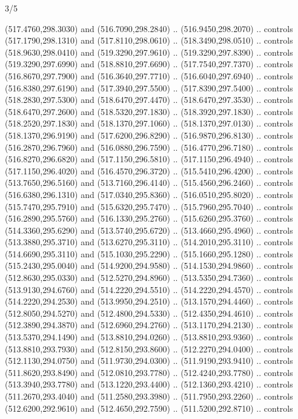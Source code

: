 \begin{flagdescription}{3/5}
\begin{scope}[shift={(0.5\flaglength,0.5\flagwidth)},scale=\flagwidth/1075]
\begin{scope}[y=0.80pt, x=0.80pt, yscale=-2.37, xscale=2.37,xshift=-402,yshift=-230.4]
  (517.4760,298.3030) and (516.7090,298.2840) .. (516.9450,298.2070) .. controls
  (517.1790,298.1310) and (517.8110,298.0610) .. (518.3490,298.0510) .. controls
  (518.9630,298.0410) and (519.3290,297.9610) .. (519.3290,297.8390) .. controls
  (519.3290,297.6990) and (518.8810,297.6690) .. (517.7540,297.7370) .. controls
  (516.8670,297.7900) and (516.3640,297.7710) .. (516.6040,297.6940) .. controls
  (516.8380,297.6190) and (517.3940,297.5500) .. (517.8390,297.5400) .. controls
  (518.2830,297.5300) and (518.6470,297.4470) .. (518.6470,297.3530) .. controls
  (518.6470,297.2600) and (518.5320,297.1830) .. (518.3920,297.1830) .. controls
  (518.2520,297.1830) and (518.1370,297.1060) .. (518.1370,297.0130) .. controls
  (518.1370,296.9190) and (517.6200,296.8290) .. (516.9870,296.8130) .. controls
  (516.2870,296.7960) and (516.0880,296.7590) .. (516.4770,296.7180) .. controls
  (516.8270,296.6820) and (517.1150,296.5810) .. (517.1150,296.4940) .. controls
  (517.1150,296.4020) and (516.4570,296.3720) .. (515.5410,296.4200) .. controls
  (513.7650,296.5160) and (513.7160,296.4140) .. (515.4560,296.2460) .. controls
  (516.6380,296.1310) and (517.0340,295.8360) .. (516.0510,295.8020) .. controls
  (515.7470,295.7910) and (515.6320,295.7470) .. (515.7960,295.7040) .. controls
  (516.2890,295.5760) and (516.1330,295.2760) .. (515.6260,295.3760) .. controls
  (514.3360,295.6290) and (513.5740,295.6720) .. (513.4660,295.4960) .. controls
  (513.3880,295.3710) and (513.6270,295.3110) .. (514.2010,295.3110) .. controls
  (514.6690,295.3110) and (515.1030,295.2290) .. (515.1660,295.1280) .. controls
  (515.2430,295.0040) and (514.9200,294.9580) .. (514.1530,294.9860) .. controls
  (512.8630,295.0330) and (512.5270,294.8960) .. (513.5350,294.7360) .. controls
  (513.9130,294.6760) and (514.2220,294.5510) .. (514.2220,294.4570) .. controls
  (514.2220,294.2530) and (513.9950,294.2510) .. (513.1570,294.4460) .. controls
  (512.8050,294.5270) and (512.4800,294.5330) .. (512.4350,294.4610) .. controls
  (512.3890,294.3870) and (512.6960,294.2760) .. (513.1170,294.2130) .. controls
  (513.5370,294.1490) and (513.8810,294.0260) .. (513.8810,293.9360) .. controls
  (513.8810,293.7930) and (512.8150,293.8600) .. (512.2270,294.0400) .. controls
  (512.1130,294.0750) and (511.9730,294.0300) .. (511.9190,293.9410) .. controls
  (511.8620,293.8490) and (512.0810,293.7780) .. (512.4240,293.7780) .. controls
  (513.3940,293.7780) and (513.1220,293.4400) .. (512.1360,293.4210) .. controls
  (511.2670,293.4040) and (511.2580,293.3980) .. (511.7950,293.2260) .. controls
  (512.6200,292.9610) and (512.4650,292.7590) .. (511.5200,292.8710) .. controls

\end{scope}
\end{scope}
\end{flagdescription}
